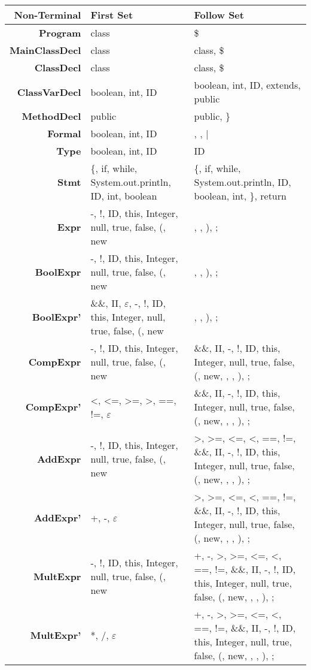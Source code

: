 \documentclass{report}
\begin{document}
%
\begin{tabularx}{\textwidth}{ r | R | R }

\textbf{Non-Terminal} & \textbf{First Set} & \textbf{Follow Set} \\
\hline
\textbf{Program} & class & \$ \\[1ex]
\textbf{MainClassDecl} & class & class, \$\\[1ex]
\textbf{ClassDecl} & class & class, \$\\[1ex] 
\textbf{ClassVarDecl} & boolean, int, ID & boolean, int, ID, extends, public \\[1ex]
\textbf{MethodDecl} & public & public, \}\\[1ex]
\textbf{Formal} & boolean, int, ID & , , |\\[1ex] 
\textbf{Type} & boolean, int, ID & ID \\[1ex]
\textbf{Stmt} & \{, if, while, System.out.println, ID, int, boolean & \{, if, while, System.out.println, ID, boolean, int, \}, return \\[1ex]
\textbf{Expr} & -, !, ID, this, Integer, null, true, false, (, new & , , ), ; \\[1ex]
\textbf{BoolExpr} & -, !, ID, this, Integer, null, true, false, (, new & , , ), ; \\[1ex]
\textbf{BoolExpr'} & \&\&, II, $\varepsilon$, -, !, ID, this, Integer, null, true, false, (, new & , , ), ; \\[1ex]
\textbf{CompExpr} & -, !, ID, this, Integer, null, true, false, (, new & \&\&, II, -, !, ID, this, Integer, null, true, false, (, new, , , ), ; \\[1ex]
\textbf{CompExpr'} & <, <=, >=, >, ==, !=, $\varepsilon$ & \&\&, II, -, !, ID, this, Integer, null, true, false, (, new, , , ), ; \\[1ex]
\textbf{AddExpr} & -, !, ID, this, Integer, null, true, false, (, new & >, >=, <=, <, ==, !=, \&\&, II, -, !, ID, this, Integer, null, true, false, (, new, , , ), ; \\[1ex]
\textbf{AddExpr'} & +, -, $\varepsilon$ & >, >=, <=, <, ==, !=, \&\&, II, -, !, ID, this, Integer, null, true, false, (, new, , , ), ; \\[1ex]
\textbf{MultExpr} & -, !, ID, this, Integer, null, true, false, (, new &  +, -, >, >=, <=, <, ==, !=, \&\&, II, -, !, ID, this, Integer, null, true, false, (, new, , , ), ; \\[1ex]
\textbf{MultExpr'} & *, /, $\varepsilon$ &  +, -, >, >=, <=, <, ==, !=, \&\&, II, -, !, ID, this, Integer, null, true, false, (, new, , , ), ;  \\[1ex]

\end{tabularx}
\end{document}
